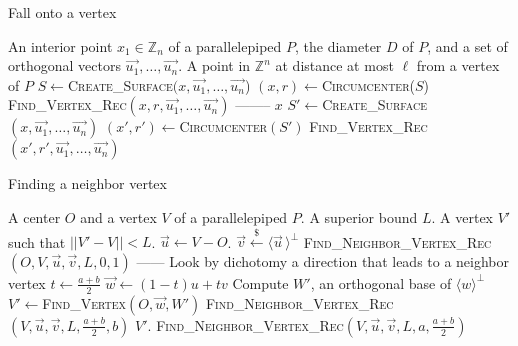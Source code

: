 \documentclass[11pt]{article}
\theoremstyle{plain}
\theoremstyle{definition}
\theoremstyle{remark}
\newcommand{\ZZ}{\mathbb{Z}}      %
\newcommand{\bra}{\langle}
\newcommand{\ket}{\rangle}
\begin{document}
\begin{algorithm}
	\caption{\label{algo:Find_Vertex}Fall onto a vertex}
	\begin{algorithmic}[1]
		\Require An interior point $x_1\in \ZZ_n$ of a parallelepiped $P$, the diameter $D$ of $P$, and a set of orthogonal vectors $\vec{u_1},\dots,\vec{u_n}$.
		\Ensure A point in $\ZZ^n$ at distance at most $\ell$ from a vertex of $P$
		\State $S\leftarrow $\textsc{Create\_Surface}$(x,\vec{u_1},\dots,\vec{u_n}$)
		\State $(x,r)\leftarrow $\textsc{Circumcenter}($S$)
		\State \textsc{Find\_Vertex\_Rec}$(x,r,\vec{u_1},\dots,\vec{u_n})$
		\EndFunction	
		\Statex --------
		\State \Return $x$
		\Else 
		\State $S'\leftarrow$\textsc{Create\_Surface}$(x,\vec{u_1},\dots,\vec{u_n})$
		\State $(x',r')\leftarrow$\textsc{Circumcenter}$(S')$
		\State \Return \textsc{Find\_Vertex\_Rec}$(x',r',\vec{u_1},\dots,\vec{u_n})$
		\EndIf 
		\EndFunction
	\end{algorithmic}
\end{algorithm}

\begin{algorithm}
	\caption{\label{algo:secondvertex}Finding a neighbor vertex}
\begin{algorithmic}[1]
\Require A center $O$ and a vertex $V$ of a parallelepiped $P$. A superior bound $L$.
\Ensure A vertex $V'$ such that $||V'-V||<L$.
\State $\vec u \leftarrow V-O$.
\State $\vec v \xleftarrow{\$}\bra \vec{u}\,\ket^\perp$ 
\State \Return \textsc{Find\_Neighbor\_Vertex\_Rec}$(O,V,\vec u,\vec v,L,0,1)$
\EndFunction
\Statex ------ \Comment Look by dichotomy a direction that leads to a neighbor vertex
\State $t\leftarrow \frac{a+b}{2}$
\State $\vec w\leftarrow (1-t)u+tv$
\State Compute $W'$, an orthogonal base of $\bra w\ket^\perp$
\State $V'\leftarrow $\textsc{Find\_Vertex}$(O,\vec w,W')$
 \Return \textsc{Find\_Neighbor\_Vertex\_Rec}$(V,\vec u,\vec v,L,\frac{a+b}{2},b)$
 \Return $V'$.
\Else \;\Return \textsc{Find\_Neighbor\_Vertex\_Rec}$(V,\vec u,\vec v,L,a,\frac{a+b}{2})$
\EndIf
\EndFunction
\end{algorithmic}
\end{algorithm}
\end{document}
